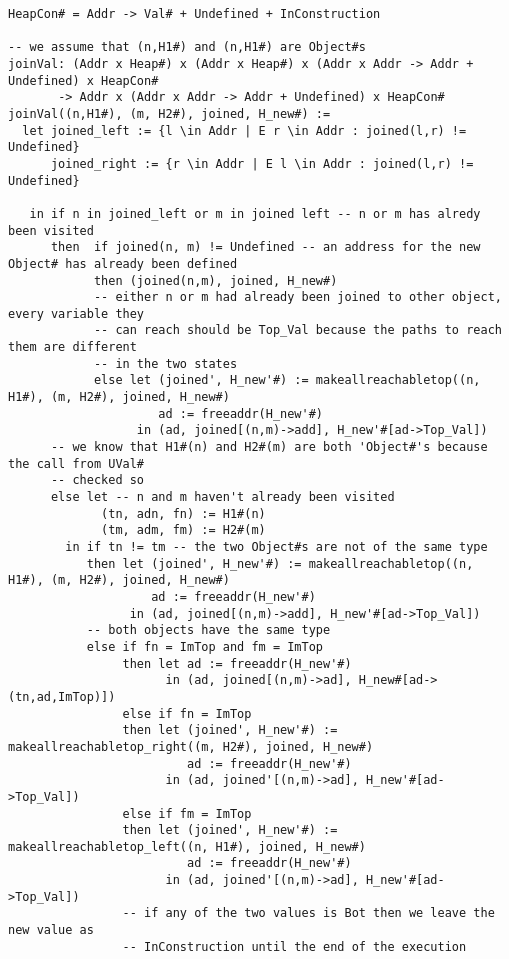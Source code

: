 \begin{verbatim}
HeapCon# = Addr -> Val# + Undefined + InConstruction

-- we assume that (n,H1#) and (n,H1#) are Object#s
joinVal: (Addr x Heap#) x (Addr x Heap#) x (Addr x Addr -> Addr + Undefined) x HeapCon#
       -> Addr x (Addr x Addr -> Addr + Undefined) x HeapCon#
joinVal((n,H1#), (m, H2#), joined, H_new#) :=
  let joined_left := {l \in Addr | E r \in Addr : joined(l,r) != Undefined}
      joined_right := {r \in Addr | E l \in Addr : joined(l,r) != Undefined}

   in if n in joined_left or m in joined left -- n or m has alredy been visited
      then  if joined(n, m) != Undefined -- an address for the new Object# has already been defined
            then (joined(n,m), joined, H_new#)
            -- either n or m had already been joined to other object, every variable they
            -- can reach should be Top_Val because the paths to reach them are different
            -- in the two states
            else let (joined', H_new'#) := makeallreachabletop((n, H1#), (m, H2#), joined, H_new#)
                     ad := freeaddr(H_new'#)
                  in (ad, joined[(n,m)->add], H_new'#[ad->Top_Val])
      -- we know that H1#(n) and H2#(m) are both 'Object#'s because the call from UVal#
      -- checked so
      else let -- n and m haven't already been visited
             (tn, adn, fn) := H1#(n)
             (tm, adm, fm) := H2#(m)
        in if tn != tm -- the two Object#s are not of the same type
           then let (joined', H_new'#) := makeallreachabletop((n, H1#), (m, H2#), joined, H_new#)
                    ad := freeaddr(H_new'#)
                 in (ad, joined[(n,m)->add], H_new'#[ad->Top_Val])
           -- both objects have the same type
           else if fn = ImTop and fm = ImTop
                then let ad := freeaddr(H_new'#)
                      in (ad, joined[(n,m)->ad], H_new#[ad->(tn,ad,ImTop)])
                else if fn = ImTop
                then let (joined', H_new'#) := makeallreachabletop_right((m, H2#), joined, H_new#)
                         ad := freeaddr(H_new'#)
                      in (ad, joined'[(n,m)->ad], H_new'#[ad->Top_Val])
                else if fm = ImTop
                then let (joined', H_new'#) := makeallreachabletop_left((n, H1#), joined, H_new#)
                         ad := freeaddr(H_new'#)
                      in (ad, joined'[(n,m)->ad], H_new'#[ad->Top_Val])
                -- if any of the two values is Bot then we leave the new value as
                -- InConstruction until the end of the execution

\end{verbatim}
